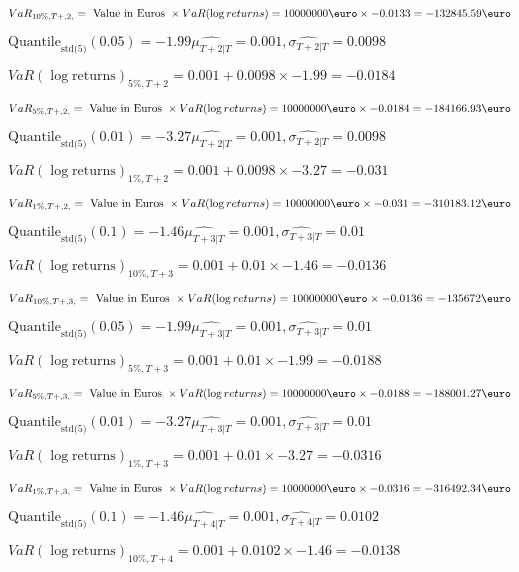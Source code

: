 $VaR_{10\%, T + ,2,} = \text{ Value in Euros } \times VaR(\log returns) = 10 000 000 \text{\euro} \times-0.0133 = -132845.59 \text{\euro}$


$\text{Quantile}_\text{std(5)}(0.05) = -1.99$$\hat{\mu_{T+2|T}} = 0.001, \hat{\sigma_{T+2|T}} = 0.0098$

$VaR(\log \text{returns})_{5\%, T + 2} = 0.001 + 0.0098\times-1.99 = -0.0184$

$VaR_{5\%, T + ,2,} = \text{ Value in Euros } \times VaR(\log returns) = 10 000 000 \text{\euro} \times-0.0184 = -184166.93 \text{\euro}$


$\text{Quantile}_\text{std(5)}(0.01) = -3.27$$\hat{\mu_{T+2|T}} = 0.001, \hat{\sigma_{T+2|T}} = 0.0098$

$VaR(\log \text{returns})_{1\%, T + 2} = 0.001 + 0.0098\times-3.27 = -0.031$

$VaR_{1\%, T + ,2,} = \text{ Value in Euros } \times VaR(\log returns) = 10 000 000 \text{\euro} \times-0.031 = -310183.12 \text{\euro}$


$\text{Quantile}_\text{std(5)}(0.1) = -1.46$$\hat{\mu_{T+3|T}} = 0.001, \hat{\sigma_{T+3|T}} = 0.01$

$VaR(\log \text{returns})_{10\%, T + 3} = 0.001 + 0.01\times-1.46 = -0.0136$

$VaR_{10\%, T + ,3,} = \text{ Value in Euros } \times VaR(\log returns) = 10 000 000 \text{\euro} \times-0.0136 = -135672 \text{\euro}$


$\text{Quantile}_\text{std(5)}(0.05) = -1.99$$\hat{\mu_{T+3|T}} = 0.001, \hat{\sigma_{T+3|T}} = 0.01$

$VaR(\log \text{returns})_{5\%, T + 3} = 0.001 + 0.01\times-1.99 = -0.0188$

$VaR_{5\%, T + ,3,} = \text{ Value in Euros } \times VaR(\log returns) = 10 000 000 \text{\euro} \times-0.0188 = -188001.27 \text{\euro}$


$\text{Quantile}_\text{std(5)}(0.01) = -3.27$$\hat{\mu_{T+3|T}} = 0.001, \hat{\sigma_{T+3|T}} = 0.01$

$VaR(\log \text{returns})_{1\%, T + 3} = 0.001 + 0.01\times-3.27 = -0.0316$

$VaR_{1\%, T + ,3,} = \text{ Value in Euros } \times VaR(\log returns) = 10 000 000 \text{\euro} \times-0.0316 = -316492.34 \text{\euro}$


$\text{Quantile}_\text{std(5)}(0.1) = -1.46$$\hat{\mu_{T+4|T}} = 0.001, \hat{\sigma_{T+4|T}} = 0.0102$

$VaR(\log \text{returns})_{10\%, T + 4} = 0.001 + 0.0102\times-1.46 = -0.0138$

